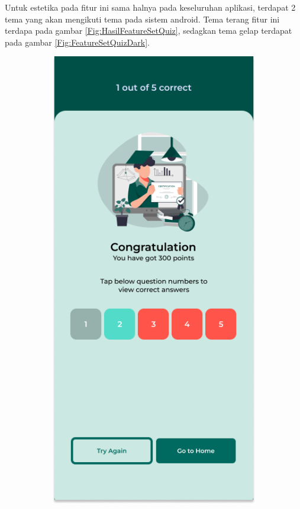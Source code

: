 Untuk estetika pada fitur ini sama halnya pada keseluruhan aplikasi, terdapat 2 tema yang akan mengikuti tema pada sistem android.
Tema terang fitur ini terdapa pada gambar \ref*{Fig:HasilFeatureSetQuiz}, sedagkan tema gelap terdapat pada gambar \ref*{Fig:FeatureSetQuizDark}.
\begin{figure}[H]
	\centering
	\begin{subfigure}[b]{0.23\textwidth}
		\centering
	  \includegraphics[width=\linewidth]{contents/chapter-3/images/HF-result.png}

\end{subfigure}
\end{figure}
